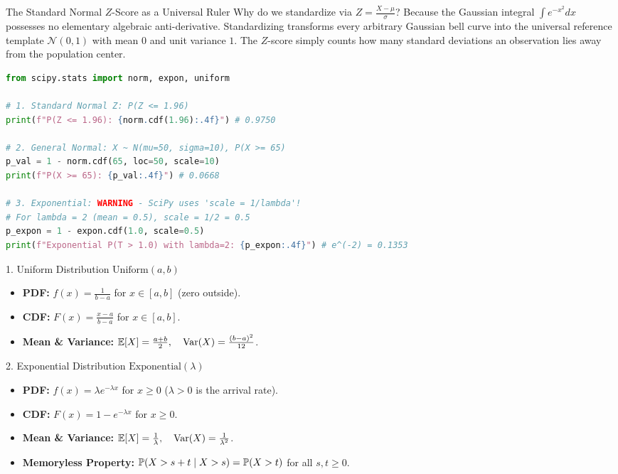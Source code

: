 \begin{intuitionbox}{The Standard Normal $Z$-Score as a Universal Ruler}
Why do we standardize via $Z = \frac{X - \mu}{\sigma}$? Because the Gaussian integral $\int e^{-x^2} dx$ possesses no elementary algebraic anti-derivative. Standardizing transforms every arbitrary Gaussian bell curve into the universal reference template $\mathcal{N}(0, 1)$ with mean $0$ and unit variance $1$. The $Z$-score simply counts how many standard deviations an observation lies away from the population center.
\end{intuitionbox}

\begin{lstlisting}[language=Python, caption=Data Science: Continuous Distributions in SciPy Stats]
from scipy.stats import norm, expon, uniform

# 1. Standard Normal Z: P(Z <= 1.96)
print(f"P(Z <= 1.96): {norm.cdf(1.96):.4f}") # 0.9750

# 2. General Normal: X ~ N(mu=50, sigma=10), P(X >= 65)
p_val = 1 - norm.cdf(65, loc=50, scale=10)
print(f"P(X >= 65): {p_val:.4f}") # 0.0668

# 3. Exponential: WARNING - SciPy uses 'scale = 1/lambda'!
# For lambda = 2 (mean = 0.5), scale = 1/2 = 0.5
p_expon = 1 - expon.cdf(1.0, scale=0.5)
print(f"Exponential P(T > 1.0) with lambda=2: {p_expon:.4f}") # e^(-2) = 0.1353
\end{lstlisting}

\begin{formulabox}{1. Uniform Distribution $\text{Uniform}(a, b)$}
\begin{itemize}
    \item \textbf{PDF:} $f(x) = \frac{1}{b - a}$ for $x \in [a, b]$ (zero outside).
    \item \textbf{CDF:} $F(x) = \frac{x - a}{b - a}$ for $x \in [a, b]$.
    \item \textbf{Mean \& Variance:} $\E[X] = \frac{a + b}{2}, \quad \Var(X) = \frac{(b - a)^2}{12}$.
\end{itemize}
\end{formulabox}

\begin{formulabox}{2. Exponential Distribution $\text{Exponential}(\lambda)$}
\begin{itemize}
    \item \textbf{PDF:} $f(x) = \lambda e^{-\lambda x}$ for $x \ge 0$ ($\lambda > 0$ is the arrival rate).
    \item \textbf{CDF:} $F(x) = 1 - e^{-\lambda x}$ for $x \ge 0$.
    \item \textbf{Mean \& Variance:} $\E[X] = \frac{1}{\lambda}, \quad \Var(X) = \frac{1}{\lambda^2}$.
    \item \textbf{Memoryless Property:} $\P(X > s + t \mid X > s) = \P(X > t)$ for all $s, t \ge 0$.
\end{itemize}
\end{formulabox}

